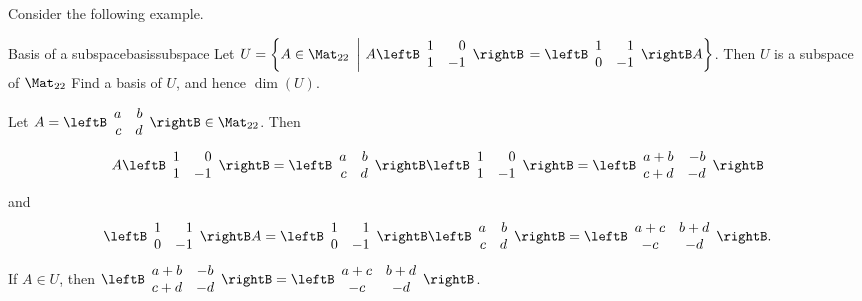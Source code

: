Consider the following example.

\begin{example}{Basis of a subspace}{basissubspace}
Let $U=\left\{ A\in\Mat_{22} ~\left|~
A\leftB\begin{array}{rr}
1 & 0 \\ 1 & -1 \end{array}\rightB\right. 
= \leftB\begin{array}{rr}
1 & 1 \\ 0 & -1 \end{array}\rightB A \right\}$. 
Then $U$ is a subspace of $\Mat_{22}$ 
Find a basis of $U$, and hence $\dim(U)$.
\end{example}

\begin{solution}
Let $A=\leftB\begin{array}{rr} a & b \\ c & d \end{array}\rightB
\in\Mat_{22}$.
Then
\[ A\leftB\begin{array}{rr} 1 & 0 \\ 1 & -1 \end{array}\rightB
= \leftB\begin{array}{rr} a & b \\ c & d \end{array}\rightB
\leftB\begin{array}{rr} 1 & 0 \\ 1 & -1 \end{array}\rightB
=\leftB\begin{array}{rr} a+b & -b \\ c+d & -d \end{array}\rightB\]
and
\[ \leftB\begin{array}{rr} 1 & 1 \\ 0 & -1 \end{array}\rightB A
= \leftB\begin{array}{rr} 1 & 1 \\ 0 & -1 \end{array}\rightB
\leftB\begin{array}{rr} a & b \\ c & d \end{array}\rightB
=\leftB\begin{array}{cc} a+c & b+d \\ -c & -d \end{array}\rightB.\]
If $A\in U$, then
$\leftB\begin{array}{cc} a+b & -b \\ c+d & -d \end{array}\rightB=
\leftB\begin{array}{cc} a+c & b+d \\ -c & -d \end{array}\rightB$.


\end{solution}
